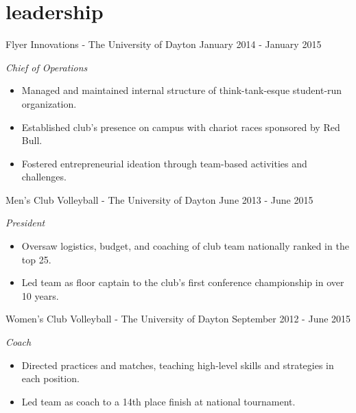 \documentclass[print]{resume}
\begin{document}
\section{leadership}
\begin{entrylist}

\entry
{}
{Flyer Innovations \thinfont\footnotesize{}- The University of Dayton}
{January 2014 - January 2015}
{
\emph{Chief of Operations} 
\begin{itemize}
    \item Managed and maintained internal structure of think-tank-esque student-run organization. 
    \item Established club's presence on campus with chariot races sponsored by Red Bull.
    \item Fostered entrepreneurial ideation through team-based activities and challenges.
\end{itemize}
}

\entry
{}
{Men's Club Volleyball \thinfont\footnotesize{}- The University of Dayton}
{June 2013 - June 2015}
{
\emph{President}
\begin{itemize}
    \item Oversaw logistics, budget, and coaching of club team nationally ranked in the top 25.
    \item Led team as floor captain to the club's first conference championship in over 10 years.
\end{itemize}
}

\entry
{}
{Women's Club Volleyball \thinfont\footnotesize{}- The University of Dayton}
{September 2012 - June 2015}
{
\emph{Coach}
\begin{itemize}
    \item Directed practices and matches, teaching high-level skills and strategies in each position.
    \item Led team as coach to a 14th place finish at national tournament.
\end{itemize}
}

\end{entrylist}

\end{document}

